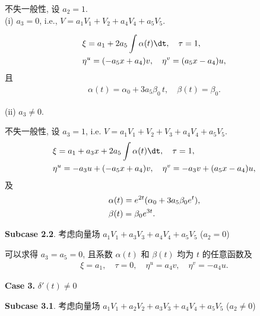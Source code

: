 不失一般性, 设 $a_2=1$.\\
(i) $a_3=0$, i.e., $V=a_1 V_1+ V_2+a_4 V_4+a_5 V_5$.

\begin{align*}
&\xi=a_1+2a_5\int\alpha(t)\dt,\quad \tau=1,\\
&\eta^u=(-a_5x+a_4)v,\quad \eta^v=(a_5x-a_4)u,
\end{align*}
且
\begin{align*}
\alpha(t)=\alpha_0+3a_5\beta_0\,t,\quad \beta(t)=\beta_0.
\end{align*}


(ii) $a_3\neq0$.

不失一般性, 设 $a_3=1$, i.e. $V=a_1 V_1+ V_2+V_3+a_4 V_4+a_5 V_5$.
\begin{align*}
&\xi=a_1+a_3x+2a_5\int\alpha(t)\dt,\quad \tau=1,\\
&\eta^u=-a_3u+(-a_5x+a_4)v,\quad \eta^v=-a_3v+(a_5x-a_4)u,
\end{align*}
及
\begin{align*}
&\alpha(t)= e^{2t}(\alpha_0+3a_5\beta_0e^{t}),\notag\\ &\beta(t)=\beta_0e^{3t}.
\end{align*}

\textbf{Subcase 2.2}. 考虑向量场 $a_1 V_1+a_3 V_3+a_4 V_4+a_5 V_5$ ($a_2= 0$)

可以求得 $a_3=a_5=0$, 且系数 $\alpha(t)$ 和 $\beta(t)$ 均为 $t$ 的任意函数及
\begin{align*}
\xi=a_1,\quad \tau=0,\quad \eta^u=a_4v,\quad \eta^v=-a_4u.
\end{align*}

\noindent \textbf{Case 3.} $\delta'(t)\neq 0$

\textbf{Subcase 3.1}. 考虑向量场 $a_1 V_1+a_2 V_2+a_3 V_3+a_4 V_4+a_5 V_5$ ($a_2\neq 0$)

